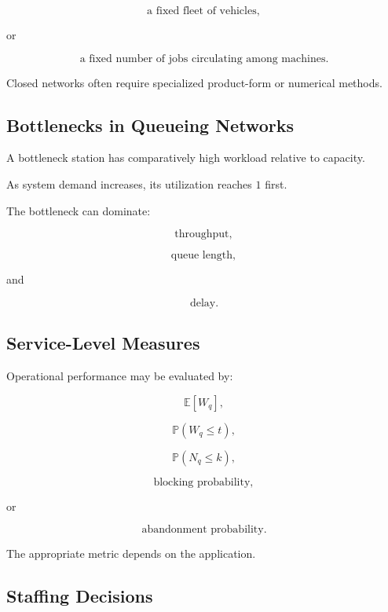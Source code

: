 \[
\boxed{
\text{a fixed fleet of vehicles},
}
\]

or

\[
\boxed{
\text{a fixed number of jobs circulating among machines}.
}
\]

Closed networks often require specialized product-form or numerical
methods.

\subsection{Bottlenecks in Queueing Networks}
\label{subsec:queueing-network-bottlenecks}

A bottleneck station has comparatively high workload relative to capacity.

As system demand increases, its utilization reaches \(1\) first.

The bottleneck can dominate:

\[
\boxed{
\text{throughput},
}
\]

\[
\boxed{
\text{queue length},
}
\]

and

\[
\boxed{
\text{delay}.
}
\]

\subsection{Service-Level Measures}
\label{subsec:queue-service-level-measures}

Operational performance may be evaluated by:

\[
\boxed{
\mathbb{E}[W_q],
}
\]

\[
\boxed{
\mathbb{P}(W_q\leq t),
}
\]

\[
\boxed{
\mathbb{P}(N_q\leq k),
}
\]

\[
\boxed{
\text{blocking probability},
}
\]

or

\[
\boxed{
\text{abandonment probability}.
}
\]

The appropriate metric depends on the application.

\subsection{Staffing Decisions}
\label{subsec:queue-staffing}

